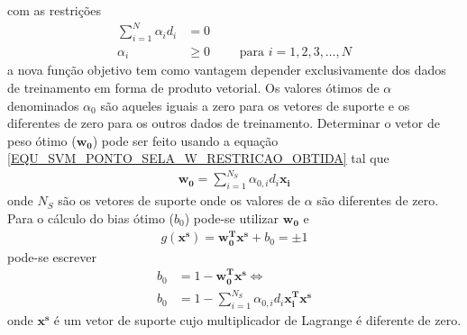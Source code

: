 com as restrições
\begin{align}
\sum\limits_{i=1}^{N} \alpha_{i}d_{i} &= 0 \\
\alpha_{i} &\geq 0	\qquad \textrm{ para } i = 1,2,3,\ldots, N
\end{align}
a nova função objetivo tem como vantagem depender exclusivamente dos dados de treinamento em forma de produto vetorial. Os valores ótimos de \(\alpha\) denominados \(\alpha_{0}\) são aqueles iguais a zero para os vetores de suporte e os diferentes de zero para os outros dados de treinamento. Determinar o vetor de peso ótimo (\(\mathbf{w_{0}}\)) pode ser feito usando a equação \eqref{EQU_SVM_PONTO_SELA_W_RESTRICAO_OBTIDA} tal que
\begin{align}
\mathbf{w_{0}} = \sum\limits_{i=1}^{N_{S}} \alpha_{0,i}d_{i}\mathbf{x_{i}} \label{EQU_SVM_W_OTIMO}
\end{align}
onde \(N_{S}\) são os vetores de suporte onde os valores de \(\alpha\) são diferentes de zero. Para o cálculo do bias ótimo (\(b_{0}\)) pode-se utilizar \(\mathbf{w_{0}}\) e 
\begin{align}
g(\mathbf{x^{s}}) = \mathbf{w_{0}^{T}}\mathbf{x^{s}} + b_{0} = \pm 1
\end{align}
pode-se escrever
\begin{align}
b_{0} &= 1 - \mathbf{w_{0}^{T}}\mathbf{x^{s}} \Leftrightarrow \\
b_{0} &= 1 - \sum\limits_{i=1}^{N_{S}} \alpha_{0,i}d_{i}\mathbf{x_{i}^{T}}\mathbf{x^{s}}
\end{align}
onde \(\mathbf{x^{s}}\) é um vetor de suporte cujo multiplicador de Lagrange é diferente de zero. 

